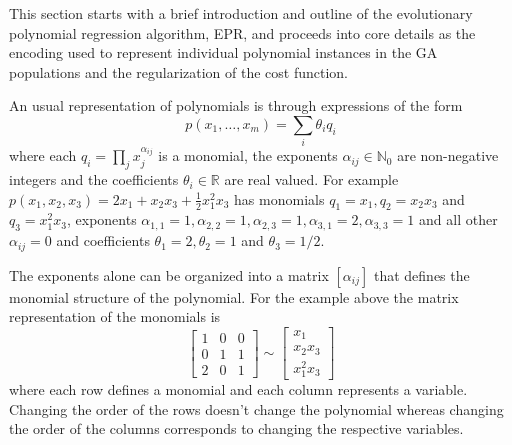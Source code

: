 \documentclass[preprint,authoryear,12pt]{elsarticle}
\begin{document}
This section starts with a brief introduction and outline of the evolutionary polynomial regression algorithm, \ac{EPR}, and proceeds into core details as the encoding used to represent individual polynomial instances in the \ac{GA} populations and the regularization of the cost function.

An usual representation of polynomials is through expressions of the form
$$
p\left( x_1, \ldots, x_m\right) = \sum_i \theta_i q_i
$$
where each $q_i = \prod_{j} x_j^{\alpha_{ij}}$ is a monomial, the exponents $\alpha_{ij}\in\mathbb{N}_0$ are non-negative integers and the coefficients $\theta_i \in \mathbb{R}$ are real valued. For example $p\left( x_1, x_2, x_3 \right) = 2 x_1 + x_2 x_3 + \frac{1}{2} x_1^2 x_3$ has monomials $q_1 = x_1, q_2 = x_2 x_3$ and $q_3 = x_1^2 x_3$, exponents $\alpha_{1,1} = 1, \alpha_{2,2}=1, \alpha_{2,3} = 1, \alpha_{3,1} = 2, \alpha_{3,3} = 1$ and all other $\alpha_{ij} = 0$ and coefficients $\theta_1 = 2, \theta_2 = 1$ and $\theta_3 = 1/2$.

The exponents alone can be organized into a matrix $\left[\alpha_{ij}\right]$ that defines the monomial structure of the polynomial. For the example above the matrix representation of the monomials is
$$
\left[ 
\begin{array}{ccc}
1 & 0 & 0 \\
0 & 1 & 1 \\
2 & 0 & 1
\end{array}
\right] \sim 
\left[ 
\begin{array}{ccc}
x_1 \\
x_2 x_3 \\
x_1^2 x_3
\end{array}
\right]
$$
where each row defines a monomial and each column represents a variable. Changing the order of the rows doesn't change the polynomial whereas changing the order of the columns corresponds to changing the respective variables.
\end{document}
